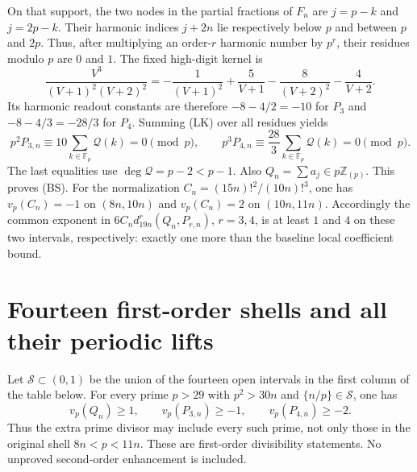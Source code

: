 \documentclass[11pt]{article}
\begin{document}
On that support, the two nodes in the partial fractions of $F_n$ are
$j=p-k$ and $j=2p-k$.  Their harmonic indices $j+2n$ lie respectively
below $p$ and between $p$ and $2p$.  Thus, after multiplying an order-$r$
harmonic number by $p^r$, their residues modulo $p$ are $0$ and $1$.
The fixed high-digit kernel is
\[
 \frac{V^3}{(V+1)^2(V+2)^2}
 =-\frac1{(V+1)^2}+\frac5{V+1}
   -\frac8{(V+2)^2}-\frac4{V+2}.
\]
Its harmonic readout constants are therefore $-8-4/2=-10$ for $P_3$ and
$-8-4/3=-28/3$ for $P_4$.  Summing (LK) over all residues yields
\[
 p^2P_{3,n}\equiv10\sum_{k\in\mathbb F_p}\mathcal Q(k)=0\pmod p,
 \qquad
 p^3P_{4,n}\equiv\frac{28}{3}
       \sum_{k\in\mathbb F_p}\mathcal Q(k)=0\pmod p.
\]
The last equalities use $\deg\mathcal Q=p-2<p-1$.
Also $Q_n=\sum a_j\in p\mathbb Z_{(p)}$.  This proves (BS).
For the normalization $C_n=(15n)!^2/(10n)!^3$, one has
$v_p(C_n)=-1$ on $(8n,10n)$ and $v_p(C_n)=2$ on $(10n,11n)$.
Accordingly the common exponent in
$6C_nd_{19n}^r(Q_n,P_{r,n})$, $r=3,4$, is at least $1$ and $4$ on these
two intervals, respectively: exactly one more than the baseline local
coefficient bound.

\section{Fourteen first-order shells and all their periodic lifts}
Let $\mathcal S\subset(0,1)$ be the union of the fourteen open intervals
in the first column of the table below.  For every prime $p>29$ with
$p^2>30n$ and $\{n/p\}\in\mathcal S$, one has
\[
 v_p(Q_n)\ge1,\qquad v_p(P_{3,n})\ge-1,\qquad
 v_p(P_{4,n})\ge-2.                                    \tag{PS}
\]
Thus the extra prime divisor may include every such prime, not only those
in the original shell $8n<p<11n$.  These are first-order divisibility
statements.  No unproved second-order enhancement is included.
\end{document}
